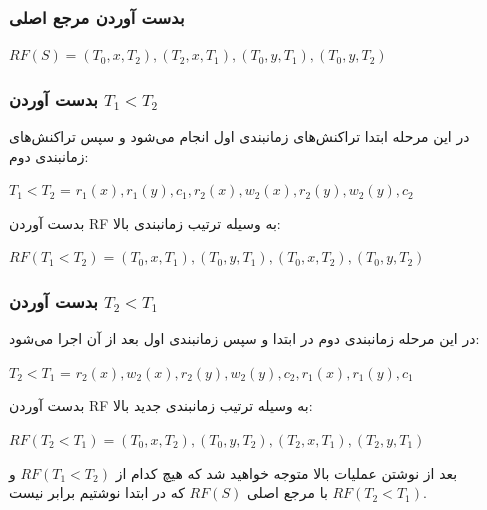 \subsubsection*{بدست آوردن مرجع اصلی}

\begin{LTR}
$RF(S) = (T_{0}, x, T_{2}), (T_{2}, x, T_{1}), (T_{0}, y, T_{1}), (T_{0}, y, T_{2})$
\end{LTR}

\subsubsection*{بدست آوردن $T_{1} < T_{2}$}

در این مرحله ابتدا تراکنش‌های زمانبندی اول انجام می‌شود و سپس تراکنش‌های زمانبندی دوم:

\begin{LTR}
$T_{1} < T_{2}$ = $r_{1}(x), r_{1}(y), c_{1}, r_{2}(x), w_{2}(x), r_{2}(y), w_{2}(y), c_{2}$
\end{LTR}

بدست آوردن RF به وسیله ترتیب زمانبندی بالا:

\begin{LTR}
$RF(T_{1} < T_{2}) = (T_{0}, x, T_{1}), (T_{0}, y, T_{1}), (T_{0}, x, T_{2}), (T_{0}, y, T_{2})$
\end{LTR}

\subsubsection*{بدست آوردن $T_{2} < T_{1}$}

در این مرحله زمانبندی دوم در ابتدا و سپس زمانبندی اول بعد از آن اجرا می‌شود:

\begin{LTR}
$T_{2} < T_{1}$ = $r_{2}(x), w_{2}(x), r_{2}(y), w_{2}(y), c_{2}, r_{1}(x), r_{1}(y), c_{1}$
\end{LTR}

بدست آوردن RF به وسیله ترتیب زمانبندی جدید بالا:

\begin{LTR}
$RF(T_{2} < T_{1}) = (T_{0}, x, T_{2}), (T_{0}, y, T_{2}), (T_{2}, x, T_{1}), (T_{2}, y, T_{1})$
\end{LTR}

بعد از نوشتن عملیات بالا متوجه خواهید شد که هیچ کدام از $RF(T_{1} < T_{2})$ و
$RF(T_{2} < T_{1})$ با مرجع اصلی $RF(S)$ که در ابتدا نوشتیم برابر نیست.

\newpage